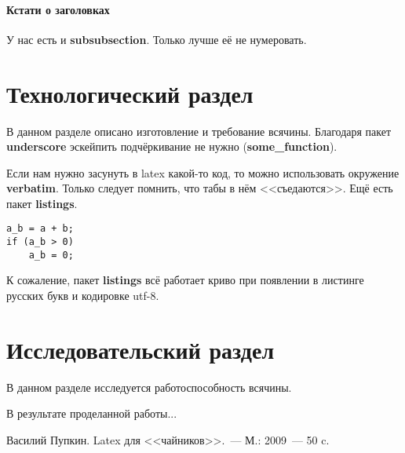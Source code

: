 \documentclass[utf8]{G7-32} %
\newcommand{\Code}[1]{\textbf{#1}}
\begin{document}
\subsubsection*{Кстати о заголовках}

У нас есть и \Code{subsubsection}. Только лучше её не нумеровать.

\chapter{Технологический раздел}



В данном разделе описано изготовление и требование всячины. Благодаря пакет \Code{underscore} эскейпить подчёркивание  не нужно (\Code{some_function}).

Если нам нужно засунуть в latex какой-то код, то можно использовать окружение \Code{verbatim}. Только следует помнить, что табы в нём <<съедаются>>. Ещё есть пакет \Code{listings}.
\begin{verbatim}
a_b = a + b;
if (a_b > 0)
    a_b = 0;
\end{verbatim}

К сожаление, пакет \Code{listings} всё работает криво при появлении в листинге русских букв и кодировке utf-8. 

\chapter{Исследовательский раздел}

В данном разделе исследуется работоспособность всячины.

\backmatter %

\Conclusion %

В результате проделанной работы...
%
\begin{thebibliography}{99}
 Василий Пупкин. Latex для <<чайников>>.~--- М.: 2009~--- 50 c.
\end{thebibliography}
\end{document}
